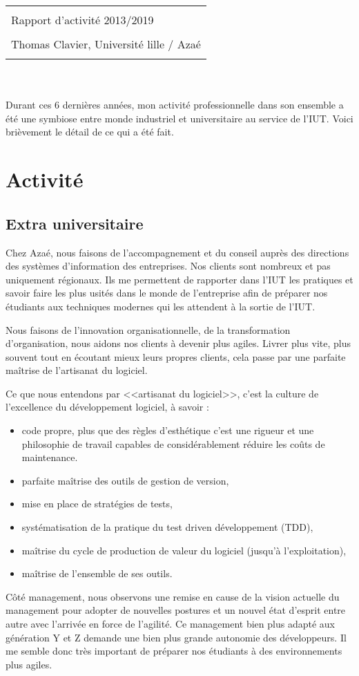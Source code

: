 \documentclass[a4paper]{article}
\title{
  \begin{tabularx}{\linewidth}{l}
    \hline\hline
    \\
    \Huge Rapport d’activité 2013/2019 \\
    \\
    \Large Thomas Clavier, \normalsize Université lille / Azaé \\
    \\
    \hline\hline
  \end{tabularx}
}
\author{}
\date{}
\begin{document}
\maketitle

Durant ces 6 dernières années, mon activité professionnelle dans son ensemble a été une symbiose entre monde industriel et universitaire au service de l'IUT.
Voici brièvement le détail de ce qui a été fait.

\section{Activité}
\subsection{Extra universitaire}
Chez Azaé, nous faisons de l'accompagnement et du conseil auprès des directions des systèmes d'information des entreprises. Nos clients sont nombreux et pas uniquement régionaux. Ils me permettent de rapporter dans l'IUT les pratiques et savoir faire les plus usités dans le monde de l'entreprise afin de préparer nos étudiants aux techniques modernes qui les attendent à la sortie de l'IUT.

Nous faisons de l'innovation organisationnelle, de la transformation d'organisation, nous aidons nos clients à devenir plus agiles. Livrer plus vite, plus souvent tout en écoutant mieux leurs propres clients, cela passe par une parfaite maîtrise de l'artisanat du logiciel.

Ce que nous entendons par <<artisanat du logiciel>>, c'est la culture de l'excellence du développement logiciel, à savoir :
\begin{itemize}
  \item code propre, plus que des règles d'esthétique c'est une rigueur et une philosophie de travail capables de considérablement réduire les coûts de maintenance.
  \item parfaite maîtrise des outils de gestion de version,
  \item mise en place de stratégies de tests,
  \item systématisation de la pratique du test driven développement (TDD),
  \item maîtrise du cycle de production de valeur du logiciel (jusqu'à l'exploitation),
  \item maîtrise de l'ensemble de ses outils.
\end{itemize}

Côté management, nous observons une remise en cause de la vision actuelle du management pour adopter de nouvelles postures et un nouvel état d'esprit entre autre avec l'arrivée en force de l'agilité. Ce management bien plus adapté aux génération Y et Z demande une bien plus grande autonomie des développeurs. Il me semble donc très important de préparer nos étudiants à des environnements plus agiles.
\end{document}
